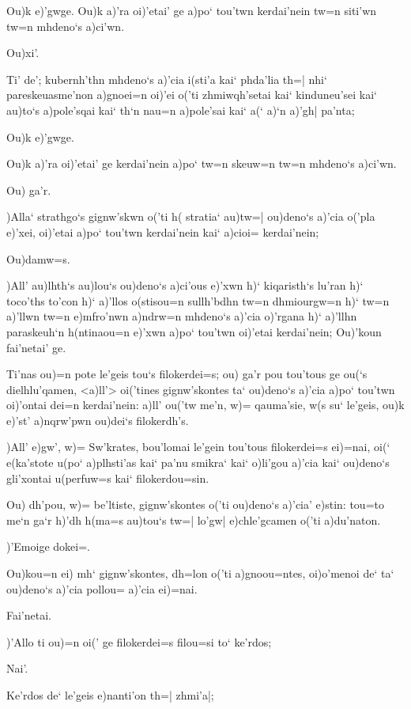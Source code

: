 \documentclass[11pt]{book}
\newcommand {\Spar} {\Npar*{=+1}\numerus{1}}
\begin{document}
\2 Ou)k e)'gwge.
\1 \Spar Ou)k a)'ra oi)'etai' ge a)po` tou'twn kerdai'nein tw=n siti'wn tw=n mhdeno`s
a)ci'wn.

\2 Ou)xi'.

\1 Ti' de'; kubernh'thn mhdeno`s a)'cia i(sti'a kai` phda'lia th=| nhi`
pareskeuasme'non a)gnoei=n oi)'ei o('ti zhmiwqh'setai kai` kinduneu'sei kai`
au)to`s a)pole'sqai kai` th`n nau=n a)pole'sai kai` a(` a)`n a)'gh| pa'nta;

\2 Ou)k e)'gwge.

\1 Ou)k a)'ra oi)'etai' ge kerdai'nein a)po` tw=n skeuw=n tw=n \Spar %
mhdeno`s a)ci'wn.

\2 Ou) ga'r.

\1 )Alla` strathgo`s gignw'skwn o('ti h( stratia` au)tw=| ou)deno`s a)'cia
o('pla e)'xei, oi)'etai a)po` tou'twn kerdai'nein kai` a)cioi= kerdai'nein;

\2 Ou)damw=s.

\1 )All' au)lhth`s au)lou`s ou)deno`s a)ci'ous e)'xwn h)` kiqaristh`s lu'ran h)`
toco'ths to'con h)` a)'llos o(stisou=n sullh'bdhn tw=n dhmiourgw=n h)` tw=n
a)'llwn tw=n e)mfro'nwn a)ndrw=n mhdeno`s a)'cia o)'rgana h)` a)'llhn
paraskeuh`n h(ntinaou=n e)'xwn a)po` tou'twn oi)'etai kerdai'nein;
\2 \Spar Ou)'koun fai'netai' ge.

\1 Ti'nas ou)=n pote le'geis tou`s filokerdei=s; ou) ga'r pou tou'tous ge ou(`s
dielhlu'qamen, <a)ll'> oi('tines gignw'skontes ta` ou)deno`s a)'cia a)po`
tou'twn oi)'ontai dei=n kerdai'nein: a)ll' ou('tw me'n, w)= qauma'sie, w(s su`
le'geis, ou)k e)'st' a)nqrw'pwn ou)dei`s filokerdh's.

\2 )All' e)gw', w)= Sw'krates, bou'lomai le'gein tou'tous filokerdei=s ei)=nai,
oi(` e(ka'stote u(po` a)plhsti'as kai` pa'nu
\Spar %
smikra` kai` o)li'gou a)'cia kai` ou)deno`s gli'xontai u(perfuw=s kai`
filokerdou=sin.

\1 Ou) dh'pou, w)= be'ltiste, gignw'skontes o('ti ou)deno`s a)'cia' e)stin:
tou=to me`n ga`r h)'dh h(ma=s au)tou`s tw=| lo'gw| e)chle'gcamen o('ti
a)du'naton.

\2 )'Emoige dokei=.

\1 Ou)kou=n ei) mh` gignw'skontes, dh=lon o('ti a)gnoou=ntes, oi)o'menoi de` ta`
ou)deno`s a)'cia pollou= a)'cia ei)=nai.

\2 Fai'netai.

\1 )'Allo ti ou)=n oi(' ge filokerdei=s filou=si to` ke'rdos;

\2 Nai'.

\1 Ke'rdos de` le'geis e)nanti'on th=| zhmi'a|;
\end{document}
